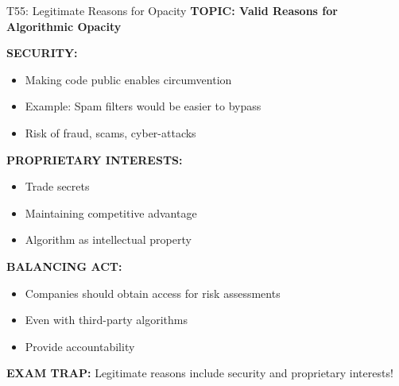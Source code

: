 \documentclass[8pt]{beamer}
\begin{document}
	\begin{frame}{T55: Legitimate Reasons for Opacity}
		\fontsize{6.5}{7.5}\selectfont
		\textbf{TOPIC: Valid Reasons for Algorithmic Opacity}
		
		\vspace{0.1cm}
		\textbf{SECURITY:}
		\begin{itemize}
			\item Making code public enables circumvention
			\item Example: Spam filters would be easier to bypass
			\item Risk of fraud, scams, cyber-attacks
		\end{itemize}
		
		\vspace{0.1cm}
		\textbf{PROPRIETARY INTERESTS:}
		\begin{itemize}
			\item Trade secrets
			\item Maintaining competitive advantage
			\item Algorithm as intellectual property
		\end{itemize}
		
		\vspace{0.1cm}
		\textbf{BALANCING ACT:}
		\begin{itemize}
			\item Companies should obtain access for risk assessments
			\item Even with third-party algorithms
			\item Provide accountability
		\end{itemize}
		
		\textcolor{myred}{\textbf{EXAM TRAP:}} Legitimate reasons include \textcolor{myblue}{security and proprietary interests}!
	\end{frame}
	
	
\end{document}
